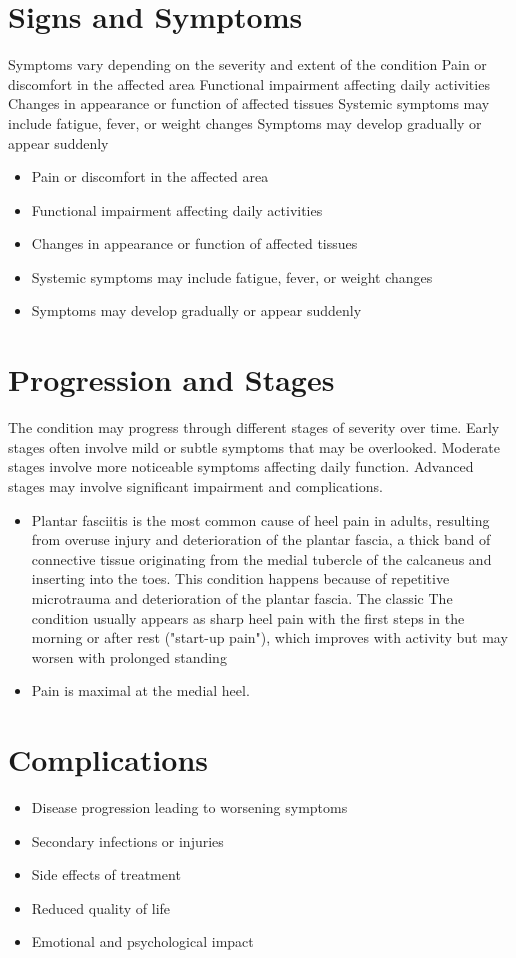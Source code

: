 \section{Signs and Symptoms}
Symptoms vary depending on the severity and extent of the condition Pain or discomfort in the affected area Functional impairment affecting daily activities Changes in appearance or function of affected tissues Systemic symptoms may include fatigue, fever, or weight changes Symptoms may develop gradually or appear suddenly

\begin{itemize}[noitemsep]
  \item Pain or discomfort in the affected area
  \item Functional impairment affecting daily activities
  \item Changes in appearance or function of affected tissues
  \item Systemic symptoms may include fatigue, fever, or weight changes
  \item Symptoms may develop gradually or appear suddenly
\end{itemize}
\section{Progression and Stages}
The condition may progress through different stages of severity over time. Early stages often involve mild or subtle symptoms that may be overlooked. Moderate stages involve more noticeable symptoms affecting daily function. Advanced stages may involve significant impairment and complications.

\begin{itemize}[noitemsep]
  \item Plantar fasciitis is the most common cause of heel pain in adults, resulting from overuse injury and deterioration of the plantar fascia, a thick band of connective tissue originating from the medial tubercle of the calcaneus and inserting into the toes. This condition happens because of repetitive microtrauma and deterioration of the plantar fascia. The classic The condition usually appears as sharp heel pain with the first steps in the morning or after rest ("start-up pain"), which improves with activity but may worsen with prolonged standing
  \item Pain is maximal at the medial heel.
\end{itemize}
\section{Complications}
\begin{itemize}[noitemsep]
  \item Disease progression leading to worsening symptoms
  \item Secondary infections or injuries
  \item Side effects of treatment
  \item Reduced quality of life
  \item Emotional and psychological impact
\end{itemize}
